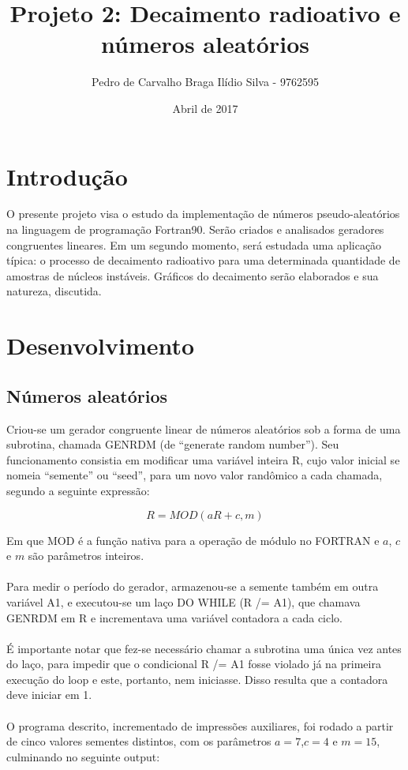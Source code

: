 \message{ !name(relatorio.tex)}\documentclass{article}
\title{Projeto 2: Decaimento radioativo e números aleatórios}
\author{Pedro de Carvalho Braga Ilídio Silva - 9762595}
\date{Abril de 2017}
\begin{document}


\maketitle

\section{Introdução}

O presente projeto visa o estudo da implementação de números pseudo-aleatórios na linguagem de programação Fortran90. Serão criados e analisados geradores congruentes lineares. Em um segundo momento, será estudada uma aplicação típica: o processo de decaimento radioativo para uma determinada quantidade de amostras de núcleos instáveis. Gráficos do decaimento serão elaborados e sua natureza, discutida.

\section{Desenvolvimento}

\subsection{Números aleatórios}

Criou-se um gerador congruente linear de números aleatórios sob a forma de uma subrotina, chamada GENRDM (de ``generate random number''). Seu funcionamento consistia em modificar uma variável inteira R, cujo valor inicial se nomeia ``semente'' ou ``seed'', para um novo valor randômico a cada chamada, segundo a seguinte expressão:


\begin{displaymath}
  \label{eq:gerador}
  R=MOD(aR+c, m)
\end{displaymath}

Em que MOD é a função nativa para a operação de módulo no FORTRAN e \(a\), \(c\) e \(m\) são parâmetros inteiros. \paragraph{}
Para medir o período do gerador, armazenou-se a semente também em outra variável A1, e executou-se um laço DO WHILE (R /= A1), que chamava GENRDM em R e incrementava uma variável contadora a cada ciclo.\paragraph{}
É importante notar que fez-se necessário chamar a subrotina uma única vez antes do laço, para impedir que o condicional R /= A1 fosse violado já na primeira execução do loop e este, portanto, nem iniciasse. Disso resulta que a contadora deve iniciar em 1.\paragraph{}
O programa descrito, incrementado de impressões auxiliares, foi rodado a partir de cinco valores sementes distintos, com os parâmetros \(a=7\),\(c=4\) e \(m = 15\), culminando no seguinte output:
\end{document}
